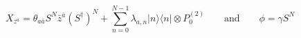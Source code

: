 \begin{equation}\label{eq:ax-uplus} 
 X_{z^a}=\theta_{a\bar{a}}S^N\bar{z}^{\bar{a}}(S^\dagger)^N+
 \sum_{n=0}^{N-1}\lambda_{a,n}|n\rangle\langle n|\otimes 
 P_0^{(2)}\qquad\text{and}\qquad\phi=\gamma S^N 
\end{equation}

